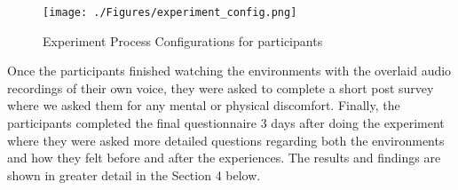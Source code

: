 \documentclass[Method.tex]{subfiles}
\begin{document}
\begin{figure} [H]
	\centering
	\texttt{[image: ./Figures/experiment\_config.png]}
	\caption{Experiment Process Configurations for participants}
	\label{fig:experiment_config}
\end{figure}

Once the participants finished watching the environments with the overlaid audio recordings of their own voice, they were asked to complete a short post survey where we asked them for any mental or physical discomfort. Finally, the participants completed the final questionnaire 3 days after doing the experiment where they were asked more detailed questions regarding both the environments and how they felt before and after the experiences. The results and findings are shown in greater detail in the Section 4 below.
\end{document}
